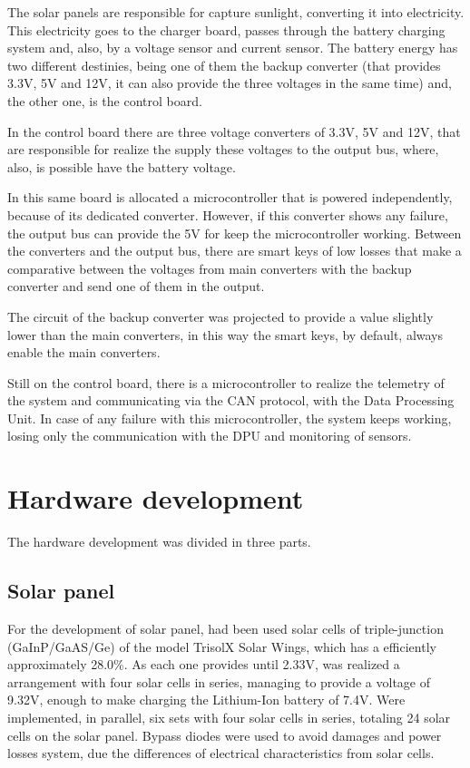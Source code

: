\documentclass[3p]{elsarticle}
\begin{document}
	The solar panels are responsible for capture sunlight, converting it into electricity. This electricity goes to the charger board, passes through the battery charging system and, also, by a voltage sensor and current sensor. The battery energy has two different destinies, being one of them the backup converter (that provides 3.3V, 5V and 12V, it can also provide the three voltages in the same time) and, the other one, is the control board. 
	
	In the control board there are three voltage converters of 3.3V, 5V and 12V, that are responsible for realize the supply these voltages to the output bus, where, also, is possible have the battery voltage. 
	
	In this same board is allocated a microcontroller that is powered independently, because of its dedicated converter.  However, if this converter shows any failure, the output bus can provide the 5V for keep the microcontroller working. Between the converters and the output bus, there are smart keys of low losses that make a comparative between the voltages from main converters with the backup converter and send one of them in the output. 
	
	The circuit of the backup converter was projected to provide a value slightly lower than the main converters, in this way the smart keys, by default, always enable the main converters.
	
	Still on the control board, there is a microcontroller to realize the telemetry of the system and communicating via the CAN protocol, with the Data Processing Unit. In case of any failure with this microcontroller, the system keeps working, losing only the communication with the DPU and monitoring of sensors.
	
\section{Hardware development}
\label{Hardware development}	

	The hardware development was divided in three parts.

\subsection{Solar panel}
\label{Solar panel}

	For the development of solar panel, had been used solar cells of triple-junction (GaInP/GaAS/Ge) of the model TrisolX Solar Wings, which has a efficiently approximately 28.0\%. As each one provides until 2.33V, was realized a arrangement with four solar cells in series, managing to provide a voltage of 9.32V, enough to make charging the Lithium-Ion battery of 7.4V. Were implemented, in parallel, six sets with four solar cells in series, totaling 24 solar cells on the solar panel. Bypass diodes were used to avoid damages and power losses system, due the differences of electrical characteristics from solar cells.\cite{TrisolX}
	
\end{document}
